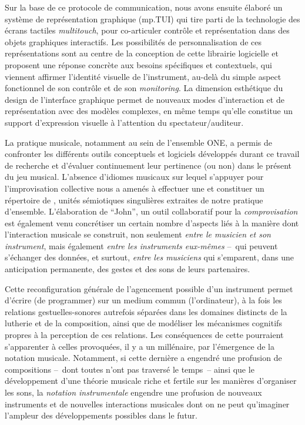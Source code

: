 \noindent Sur la base de ce protocole de communication, nous avons ensuite élaboré un système de représentation graphique (mp.TUI) qui tire parti de la technologie des écrans tactiles \textit{multitouch}, pour co-articuler contrôle et représentation dans des objets graphiques interactifs. Les possibilités de personnalisation de ces représentations sont au centre de la conception de cette librairie logicielle et proposent une réponse concrète aux besoins spécifiques et contextuels, qui viennent affirmer l'identité visuelle de l'instrument, au-delà du simple aspect fonctionnel de son contrôle et de son \textit{monitoring}. La dimension esthétique du design de l'interface graphique permet de nouveaux modes d'interaction et de représentation avec des modèles complexes, en même temps qu'elle constitue un support d'expression visuelle à l'attention du spectateur/auditeur.

\noindent La pratique musicale, notamment au sein de l'ensemble ONE, a permis de confronter les différents outils conceptuels et logiciels développés durant ce travail de recherche et d'évaluer continuement leur pertinence (ou non) dans le présent du jeu musical. L'absence d'idiomes musicaux sur lequel s'appuyer pour l'improvisation collective nous a amenés à effectuer une  et constituer un répertoire de , unités sémiotiques singulières extraites de notre pratique d'ensemble. L'élaboration de ``John'', un outil collaboratif pour la \textit{comprovisation} est également venu concrétiser un certain nombre d'aspects liés à la manière dont l'interaction musicale se construit, non seulement \textit{entre le musicien et son instrument}, mais également \textit{entre les instruments eux-mêmes} --~qui peuvent s'échanger des données, et surtout, \textit{entre les musiciens} qui s'emparent, dans une anticipation permanente, des gestes et des sons de leurs partenaires.


\noindent Cette reconfiguration générale de l'agencement possible d'un instrument permet d'écrire (de programmer) sur un medium commun (l'ordinateur), à la fois les relations gestuelles-sonores autrefois séparées dans les domaines distincts de la lutherie et de la composition, ainsi que de modéliser les mécanismes cognitifs propres à la perception de ces relations. Les conséquences de cette  pourraient s'apparenter à celles provoquées, il y a un millénaire, par l'émergence de la notation musicale. Notamment, si cette dernière a engendré une profusion de compositions --~dont toutes n'ont pas traversé le temps~-- ainsi que le développement d'une théorie musicale riche et fertile sur les manières d'organiser les sons, la \textit{notation instrumentale} engendre une profusion de nouveaux instruments et de nouvelles interactions musicales dont on ne peut qu'imaginer l'ampleur des développements possibles dans le futur.

